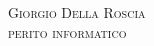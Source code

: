 \documentclass[a4paper, 10pt, oneside]{article}
\begin{document}
    \begin{center}
        \huge{\textsc{Giorgio Della Roscia}}\\[3mm]
        \Large{\textsc{perito informatico}}\\[3mm]
    \end{center}
\end{document}

